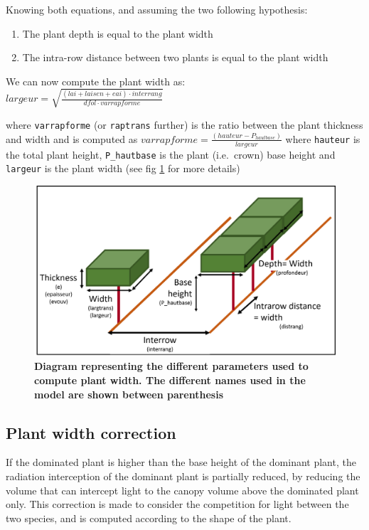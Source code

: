 \documentclass[
]{book}
\providecommand{\tightlist}{%
  \setlength{\itemsep}{0pt}\setlength{\parskip}{0pt}}
\begin{document}
Knowing both equations, and assuming the two following hypothesis:

\begin{enumerate}
\def\labelenumi{\arabic{enumi}.}
\tightlist
\item
  The plant depth is equal to the plant width
\item
  The intra-row distance between two plants is equal to the plant width
\end{enumerate}

We can now compute the plant width as:\\
\(largeur=\sqrt{\frac{(lai+laisen+eai)\cdot interrang}{dfol\cdot varrapforme}}\)

where \texttt{varrapforme} (or \texttt{raptrans} further) is the ratio between the plant thickness and width and is computed as \(varrapforme=\frac{(hauteur-P_{hautbase})}{largeur}\) where \texttt{hauteur} is the total plant height, \texttt{P\_hautbase} is the plant (i.e.~crown) base height and \texttt{largeur} is the plant width (see fig \ref{fig:Width} for more details)

\begin{figure}
\centering
\includegraphics{img/Light-interception-dominant-1.png}
\caption{\label{fig:Width}\textbf{Diagram representing the different parameters used to compute plant width. The different names used in the model are shown between parenthesis}}
\end{figure}

\hypertarget{plant-width-correction}{%
\subsection{Plant width correction}\label{plant-width-correction}}

If the dominated plant is higher than the base height of the dominant plant, the radiation interception of the dominant plant is partially reduced, by reducing the volume that can intercept light to the canopy volume above the dominated plant only. This correction is made to consider the competition for light between the two species, and is computed according to the shape of the plant.
\end{document}
